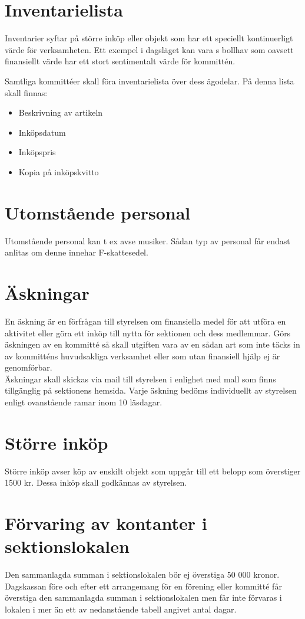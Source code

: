 \documentclass[11pt, includeaddress]{classes/cthit}
\begin{document}
\section{Inventarielista}
Inventarier syftar på större inköp eller objekt som har ett speciellt kontinuerligt värde för verksamheten. Ett exempel i dagsläget kan vara \NOLLKIT{}s bollhav som oavsett finansiellt värde har ett stort sentimentalt värde för kommittén.

Samtliga kommittéer skall föra inventarielista över dess ägodelar. På denna lista skall finnas:

\begin{itemize}
	\item Beskrivning av artikeln
	\item Inköpsdatum
	\item Inköpspris
	\item Kopia på inköpskvitto
\end{itemize}


\section{Utomstående personal}
Utomstående personal kan t ex avse musiker. Sådan typ av personal får endast anlitas om denne innehar F-skattesedel.

\section{Äskningar}
En äskning är en förfrågan till styrelsen om finansiella medel för att utföra en aktivitet eller göra ett inköp till nytta för sektionen och dess medlemmar. Görs äskningen av en kommitté så skall utgiften vara av en sådan art som inte täcks in av kommitténs huvudsakliga verksamhet eller som utan finansiell hjälp ej är genomförbar. \\

Äskningar skall skickas via mail till styrelsen i enlighet med mall som finns tillgänglig på sektionens hemsida. Varje äskning bedöms individuellt av styrelsen enligt ovanstående ramar inom 10 läsdagar.

\section{Större inköp}
Större inköp avser köp av enskilt objekt som uppgår till ett belopp som överstiger 1500 kr. Dessa inköp skall godkännas av styrelsen.

\section{Förvaring av kontanter i sektionslokalen}
Den sammanlagda summan i sektionslokalen bör ej överstiga 50 000 kronor. \\
Dagskassan före och efter ett arrangemang för en förening eller kommitté får överstiga den sammanlagda summan i sektionslokalen men får inte förvaras i lokalen i mer än ett av nedanstående tabell angivet antal dagar.
\end{document}
